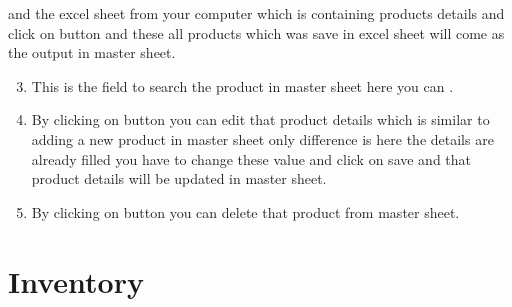 \documentclass[letterpaper,10pt,english]{sphinxmanual}
\begin{document}
\begin{figure}[htbp]
\centering

\noindent{}
\end{figure}

and  the excel sheet from your computer which is containing products details and click on  button and these all products which was save in excel sheet will come as the output in master sheet.
\begin{enumerate}
\setcounter{enumi}{2}
\item {} 
This is the  field to search the product in master sheet here you can  .

\item {} 
By clicking on  button you can edit that product details which is similar to adding a new product in master sheet only difference is here the details are already filled you have to change these value and click on save and that product  details will be updated in master sheet.

\item {} 
By clicking on  button you can delete that product from master sheet.

\end{enumerate}


\chapter{Inventory}
\label{\detokenize{inventory::doc}}\label{\detokenize{inventory:inventory}}
\begin{figure}[htbp]
\centering

\noindent{}
\end{figure}
\end{document}
